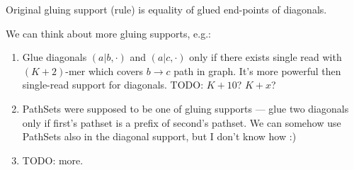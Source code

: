 \documentclass[a4paper]{article}
\begin{document}
Original gluing support (rule) is equality of glued end-points of diagonals.

We can think about more gluing supports, e.g.:
\begin{enumerate}
\item Glue diagonals $(a|b, \cdot)$ and $(a|c, \cdot)$ only if there exists single read with $(K+2)$-mer which covers $b \rightarrow c$ path in graph. It's more powerful then single-read support for diagonals. TODO: $K+10$? $K+x$?
\item PathSets were supposed to be one of gluing supports --- glue two diagonals only if first's pathset is a prefix of second's pathset. We can somehow use PathSets also in the diagonal support, but I don't know how :)
\item TODO: more.
\end{enumerate}



\end{document}
